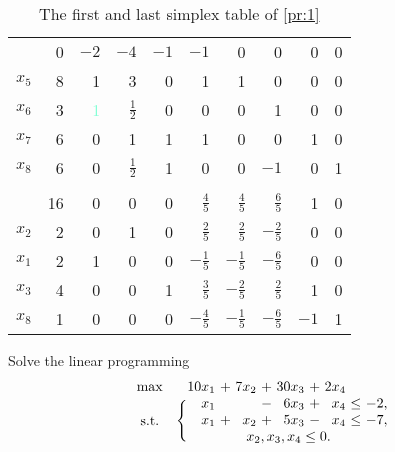 \documentclass{assignment}[2019/10/15]
\newcommand{\basis}[1]{\textcolor{Aquamarine}{#1}}
\begin{document}
    \begin{table}[htb]
        \begin{center}
            \caption{The first and last simplex table of \ref{pr:1}}
            \begin{tabularx}{14cm}{cR|*{8}{R}}
                \toprule
                & 0 & $-2$ & $-4$ & $-1$ & $-1$ & 0 & 0 & 0 & 0\\
                $x_5$ & 8 & 1 & 3 & 0 & 1 & 1 & 0 & 0 & 0\\
                $x_6$ & 3 & \basis{1} & $\tfrac{1}{2}$ & 0 & 0 & 0 & 1 & 0 & 0\\
                $x_7$ & 6 & 0 & 1 & 1 & 1 & 0 & 0 & 1 & 0\\
                $x_8$ & 6 & 0 & $\tfrac{1}{2}$ & 1 & 0 & 0 & $-1$ & 0 & 1\\
                \midrule \\ \midrule
                & 16 & 0 & 0 & 0 & $\tfrac{4}{5}$ & $\tfrac{4}{5}$ & $\tfrac{6}{5}$ & 1 & 0\\
                $x_2$ & 2 & 0 & 1 & 0 & $\tfrac{2}{5}$ & $\tfrac{2}{5}$ & $-\tfrac{2}{5}$ & 0 & 0\\
                $x_1$ & 2 & 1 & 0 & 0 & $-\tfrac{1}{5}$ & $-\tfrac{1}{5}$ & $-\tfrac{6}{5}$ & 0 & 0\\
                $x_3$ & 4 & 0 & 0 & 1 & $\tfrac{3}{5}$ & $-\tfrac{2}{5}$ & $\tfrac{2}{5}$ & 1 & 0\\
                $x_8$ & 1 & 0 & 0 & 0 & $-\tfrac{4}{5}$ & $-\tfrac{1}{5}$ & $-\tfrac{6}{5}$ & $-1$ & 1\\
                \bottomrule
            \end{tabularx}
        \end{center}
    \end{table}
    \clearpage
    \begin{problem}\label{pr:2}
        Solve the linear programming
        \begin{equation}
            \begin{blockarray}{c*{4}{r@{\hspace{0.33em}}c@{\hspace{0.33em}}}l}
                \max & 10x_1 & +&7x_2 & +&30x_3 & +&2x_4\\
                \begin{block}{\BAmultirow{3em}\{*{4}{r@{\hspace{0.33em}}c@{\hspace{0.33em}}}l}
                    \centering\text{s.t.} & x_1 & & &-&6x_3 & +&x_4 & \leq & -2,\\
                    & x_1 & + &x_2 &+ &5x_3&-&x_4 & \leq & -7,\\
                    \begin{block*}{c\BAmulticolumn{9}{c}}
                        & x_2, x_3, x_4\leq 0.\\
                    \end{block*}
                \end{block}
            \end{blockarray}
        \end{equation}
    \end{problem}
\end{document}
